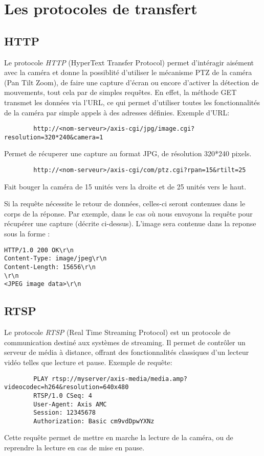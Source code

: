 	\section{Les protocoles de transfert}
		\subsection{HTTP}
		Le protocole \textit{HTTP} (HyperText Transfer Protocol) permet d'intéragir
		aisément avec la caméra et donne la possiblité d'utiliser le mécanisme PTZ de la
		caméra (Pan Tilt Zoom), de faire une capture d'écran ou encore d'activer la
		détection de mouvements, tout cela par de simples requêtes. En effet, la
		méthode GET transmet les données via l'URL, ce qui permet d'utiliser toutes les fonctionnalités de la caméra par simple appels à des
		adresses définies. Exemple d'URL:
		\begin{lstlisting}
		http://<nom-serveur>/axis-cgi/jpg/image.cgi?resolution=320*240&camera=1
		\end{lstlisting}
		Permet de récuperer une capture au format JPG, de résolution
		320*240 pixels.
		\begin{lstlisting}
		http://<nom-serveur>/axis-cgi/com/ptz.cgi?rpan=15&rtilt=25
		\end{lstlisting}
		Fait bouger la caméra de 15 unités vers la droite et de 25
		unités vers le haut.
		
		Si la requête nécessite le retour de données, celles-ci seront contenues
		dans le corps de la réponse. Par exemple, dans le cas où nous envoyons la
		requête pour récupérer une capture (décrite ci-dessus). L'image sera
		contenue dans la reponse sous la forme : 
		\begin{lstlisting}
HTTP/1.0 200 OK\r\n
Content-Type: image/jpeg\r\n
Content-Length: 15656\r\n
\r\n
<JPEG image data>\r\n
\end{lstlisting}
		\subsection{RTSP}
		Le protocole \textit{RTSP} (Real Time Streaming Protocol) est un protocole de
		communication destiné aux systèmes de streaming. Il permet de contrôler un serveur de média à distance, offrant des fonctionnalités
		classiques d'un lecteur vidéo telles que lecture et pause.
		Exemple de requête:
		\begin{lstlisting}
		PLAY rtsp://myserver/axis-media/media.amp?videocodec=h264&resolution=640x480
		RTSP/1.0 CSeq: 4
		User-Agent: Axis AMC
		Session: 12345678
		Authorization: Basic cm9vdDpwYXNz
		\end{lstlisting}
		Cette requête permet de mettre en marche la lecture de la caméra, ou de
		reprendre la lecture en cas de mise en pause.
		\newline
